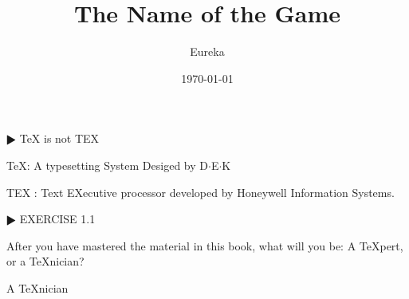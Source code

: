 \documentclass{article}
\title{The Name of the Game}
\author{Eureka}
\date{\today}
\begin{document}
\maketitle


$\RHD$ { \TeX{} is not TEX}

\bigskip
\TeX : A typesetting System Desiged by D$\cdot$E$\cdot$K

TEX : Text EXecutive processor developed by Honeywell Information Systems. 


$\RHD$ EXERCISE 1.1

\bigskip
After you have mastered the material in this book, what will you be: A \TeX pert,
or a \TeX nician?

A \TeX nician
\end{document}
